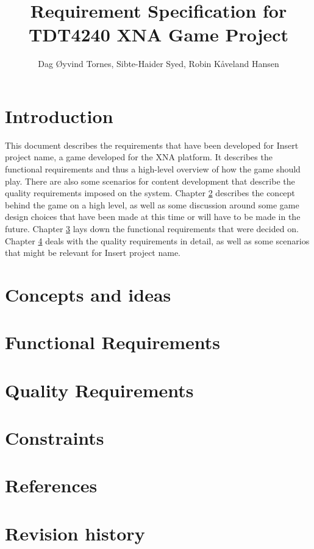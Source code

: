 \documentclass[a4paper,11pt]{article}
\author{Dag Øyvind Tornes, Sibte-Haider Syed, Robin Kåveland Hansen}
\title{Requirement Specification for TDT4240 XNA Game Project}
\def \project {Insert project name}
\begin{document}
\maketitle

\clearpage

\tableofcontents

\clearpage

\section{Introduction}
This document describes the requirements that have been developed for \project,
a game developed for the XNA platform. It describes the functional requirements
and thus a high-level overview of how the game should play. There are also some
scenarios for content development that describe the quality requirements imposed
on the system. Chapter \ref{concepts} describes the concept behind the game on
a high level, as well as some discussion around some game design choices that
have been made at this time or will have to be made in the future. Chapter
\ref{funcreq} lays down the functional requirements that were decided on.
Chapter \ref{qualreq} deals with the quality requirements in detail, as well as
some scenarios that might be relevant for \project.

\section{Concepts and ideas}
\label{concepts}

\section{Functional Requirements}
\label{funcreq}

\section{Quality Requirements}
\label{qualreq}

\section{Constraints}
\label{constraints}

\section{References}


\section{Revision history}
\end{document}
